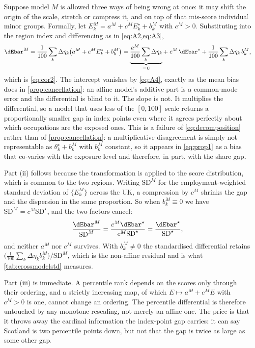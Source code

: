 Suppose model $M$ is allowed three ways of being wrong at once: it may shift the origin of the scale, stretch or compress it, and on top of that mis-score individual minor groups. Formally, let $E^{M}_k = a^{M} + c^{M} E^{\star}_k + b^{M}_k$ with $c^{M} > 0$. Substituting into the region index and differencing as in \cref{eq:A2,eq:A3},
\begin{equation}\label{eq:A6b}
\dEbar^{M}
= \frac{1}{100} \sum_k \Delta\eta_k \bigl( a^{M} + c^{M} E^{\star}_k + b^{M}_k \bigr)
= \underbrace{\frac{a^{M}}{100} \sum_k \Delta\eta_k}_{=\,0}
+\; c^{M}\, \dEbar^{\star}
+ \frac{1}{100} \sum_k \Delta\eta_k\, b^{M}_k ,
\end{equation}
which is \cref{eq:cor2}. The intercept vanishes by \cref{eq:A4}, exactly as the mean bias does in \cref{prop:cancellation}: an affine model's additive part is a common-mode error and the differential is blind to it. The slope is not. It multiplies the differential, so a model that uses less of the $[0,100]$ scale returns a proportionally smaller gap in index points even where it agrees perfectly about which occupations are the exposed ones. This is a failure of \cref{eq:decomposition} rather than of \cref{prop:cancellation}: a multiplicative disagreement is simply not representable as $\theta^{\star}_k + b^{M}_k$ with $b^{M}_k$ constant, so it appears in \cref{eq:prop1} as a bias that co-varies with the exposure level and therefore, in part, with the share gap.

Part (ii) follows because the transformation is applied to the score distribution, which is common to the two regions. Writing $\mathrm{SD}^{M}$ for the employment-weighted standard deviation of $\{E^{M}_k\}$ across the UK, a compression by $c^{M}$ shrinks the gap and the dispersion in the same proportion. So when $b^{M}_k \equiv 0$ we have $\mathrm{SD}^{M} = c^{M} \mathrm{SD}^{\star}$, and the two factors cancel:
\begin{equation}\label{eq:A6c}
\frac{\dEbar^{M}}{\mathrm{SD}^{M}}
= \frac{c^{M} \dEbar^{\star}}{c^{M} \mathrm{SD}^{\star}}
= \frac{\dEbar^{\star}}{\mathrm{SD}^{\star}} ,
\end{equation}
and neither $a^{M}$ nor $c^{M}$ survives. With $b^{M}_k \ne 0$ the standardised differential retains \\ $\bigl(\tfrac{1}{100}\sum_k \Delta\eta_k b^{M}_k\bigr) / \mathrm{SD}^{M}$, which is the non-affine residual and is what \cref{tab:crossmodelstd} measures.
 

Part (iii) is immediate. A percentile rank depends on the scores only through their ordering, and a strictly increasing map, of which $E \mapsto a^{M} + c^{M} E$ with $c^{M} > 0$ is one, cannot change an ordering. The percentile differential is therefore untouched by any monotone rescaling, not merely an affine one. The price is that it throws away the cardinal information the index-point gap carries: it can say Scotland is two percentile points down, but not that the gap is twice as large as some other gap.
 
